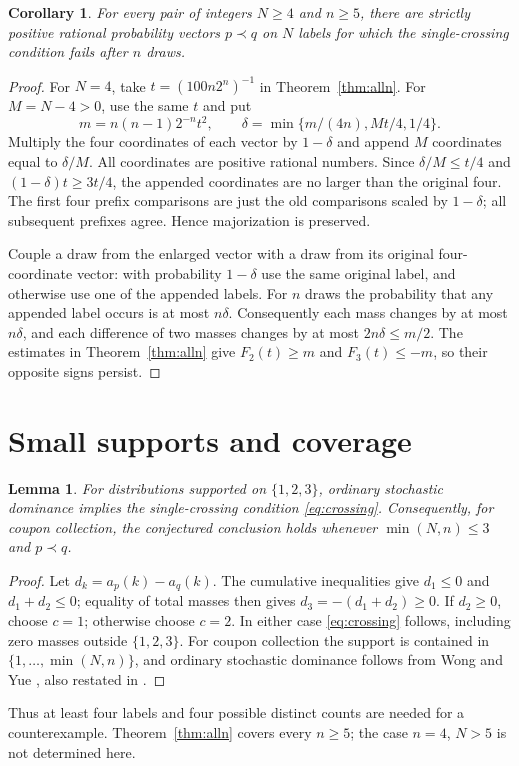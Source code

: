 \documentclass[11pt,a4paper]{article}
\newtheorem{corollary}[theorem]{Corollary}
\newtheorem{lemma}[theorem]{Lemma}
\begin{document}
\begin{corollary}\label{cor:allN}
For every pair of integers $N\geq4$ and $n\geq5$, there are strictly
positive rational probability vectors $p\prec q$ on $N$ labels for which
the single-crossing condition fails after $n$ draws.
\end{corollary}
\begin{proof}
For $N=4$, take $t=(100n2^n)^{-1}$ in Theorem~\ref{thm:alln}.
For $M=N-4>0$, use the same $t$ and put
\[
 m=n(n-1)2^{-n}t^2,\qquad
 \delta=\min\{m/(4n),Mt/4,1/4\}.
\]
Multiply the four coordinates of each vector by $1-\delta$ and
append $M$ coordinates equal to $\delta/M$. All coordinates are
positive rational numbers. Since $\delta/M\leq t/4$ and
$(1-\delta)t\geq3t/4$, the appended coordinates are no larger than
the original four. The first four prefix comparisons are just the
old comparisons scaled by $1-\delta$; all subsequent prefixes agree.
Hence majorization is preserved.

Couple a draw from the enlarged vector with a draw from its original
four-coordinate vector: with probability $1-\delta$ use the same
original label, and otherwise use one of the appended labels.
For $n$ draws the probability that any appended label occurs is at
most $n\delta$. Consequently each mass changes by at most $n\delta$,
and each difference of two masses changes by at most $2n\delta\leq m/2$.
The estimates in Theorem~\ref{thm:alln} give $F_2(t)\geq m$ and
$F_3(t)\leq-m$, so their opposite signs persist.
\end{proof}

\section{Small supports and coverage}
\begin{lemma}\label{lem:three}
For distributions supported on $\{1,2,3\}$, ordinary stochastic
dominance implies the single-crossing condition \eqref{eq:crossing}.
Consequently, for coupon collection, the conjectured conclusion holds
whenever $\min(N,n)\leq3$ and $p\prec q$.
\end{lemma}
\begin{proof}
Let $d_k=a_p(k)-a_q(k)$. The cumulative inequalities give
$d_1\leq0$ and $d_1+d_2\leq0$; equality of total masses then gives
$d_3=-(d_1+d_2)\geq0$.
If $d_2\geq0$, choose $c=1$; otherwise choose $c=2$.
In either case \eqref{eq:crossing} follows, including zero masses
outside $\{1,2,3\}$.
For coupon collection the support is contained in
$\{1,\ldots,\min(N,n)\}$, and ordinary stochastic dominance follows
from Wong and Yue \cite[pp.~391--398]{wongyue}, also restated in
\cite[Corollary~6.1 and Remark~6.1, pp.~25--26]{zoroa}.
\end{proof}
Thus at least four labels and four possible distinct counts are needed
for a counterexample. Theorem~\ref{thm:alln} covers every $n\geq5$;
the case $n=4$, $N>5$ is not determined here.
\end{document}
